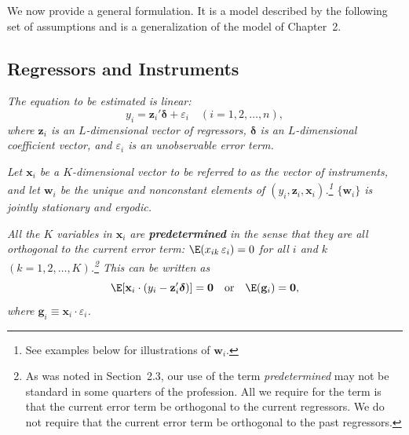 
We now provide a general formulation.  It is a model described by the following set
of assumptions and is a generalization of the model of Chapter~2.

\subsection*{Regressors and Instruments}

\begin{assumption}[linearity]
\label{ass:3.1}
\emph{The equation to be estimated is linear:}
\[
  y_i = \mathbf{z}_i' \boldsymbol{\delta} + \varepsilon_i
  \quad (i = 1, 2, \ldots, n),
\]
\emph{where $\mathbf{z}_i$ is an $L$-dimensional vector of regressors, $\boldsymbol{\delta}$ is an
$L$-dimensional coefficient vector, and $\varepsilon_i$ is an unobservable error term.}
\end{assumption}

\begin{assumption}
\label{ass:3.2}
\emph{Let $\mathbf{x}_i$ be a $K$-dimensional vector to be
referred to as the vector of instruments, and let $\mathbf{w}_i$ be the unique and nonconstant
elements of $(y_i, \mathbf{z}_i, \mathbf{x}_i)$.\footnote{See examples below for illustrations of
$\mathbf{w}_i$.}  $\{\mathbf{w}_i\}$ is jointly stationary and ergodic.}
\end{assumption}

\begin{assumption}
\label{ass:3.3}
\emph{All the $K$ variables in $\mathbf{x}_i$ are \textbf{predetermined} in the sense that they are all
orthogonal to the current error term:
$\E(x_{ik}\,\varepsilon_i) = 0$ for all $i$ and $k$ $(k = 1, 2, \ldots, K)$.\footnote{As was noted in
Section~2.3, our use of the term \emph{predetermined} may not be standard in some quarters
of the profession.  All we require for the term is that the current error term be orthogonal
to the current regressors.  We do not require that the current error term be orthogonal to
the past regressors.}  This can be written as}
\[
  \E[\mathbf{x}_i \cdot (y_i - \mathbf{z}_i' \boldsymbol{\delta})] = \mathbf{0}
  \quad \text{or} \quad
  \E(\mathbf{g}_i) = \mathbf{0},
\]
\emph{where $\mathbf{g}_i \equiv \mathbf{x}_i \cdot \varepsilon_i$.}
\end{assumption}

